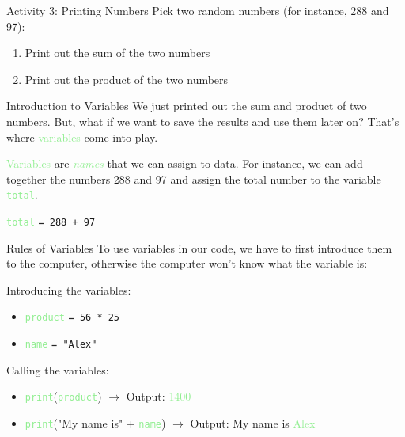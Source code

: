 \documentclass[hyperref={pdfpagemode=FullScreen},aspectratio=169]{beamer}
\begin{document}
  \begin{frame}{Activity 3: Printing Numbers}
    Pick two random numbers (for instance, 288 and 97): 
    \begin{enumerate}
      \item Print out the sum of the two numbers
      \item Print out the product of the two numbers
    \end{enumerate}
  \end{frame}

  \begin{frame}{Introduction to Variables}
    We just printed out the sum and product of two numbers. But, what if we want to save the results and use them later on? That's where \textcolor{lightGreen}{variables} come into play. 

    \bigskip
    \textcolor{lightGreen}{Variables} are \textcolor{lightGreen}{\textit{names}} that we can assign to data. For instance, we can add together the numbers 288 and 97 and assign the total number to the variable \textcolor{lightGreen}{\texttt{total}}.

    \begin{center}
      {\Large \textcolor{lightGreen}{\texttt{total}} \texttt{= 288 + 97}}
    \end{center}
  \end{frame}

  \begin{frame}{Rules of Variables}
    To use variables in our code, we have to first introduce them to the computer, otherwise the computer won't know what the variable is: 

    \medskip
    Introducing the variables:
    \begin{itemize}
      \item \textcolor{lightGreen}{\texttt{product}} \texttt{= 56 * 25} 
      
      \item \textcolor{lightGreen}{\texttt{name}} \texttt{= "Alex"} 
      
    \end{itemize}

    Calling the variables:
    \begin{itemize}
      \item \textcolor{lightGreen}{\texttt{print}}(\textcolor{lightGreen}{\texttt{product}}) $\rightarrow$ Output: \textcolor{lightGreen}{1400}
      \item \textcolor{lightGreen}{\texttt{print}}("My name is" + \textcolor{lightGreen}{\texttt{name}}) $\rightarrow$ Output: My name is \textcolor{lightGreen}{Alex}
    \end{itemize}

  \end{frame}
\end{document}
